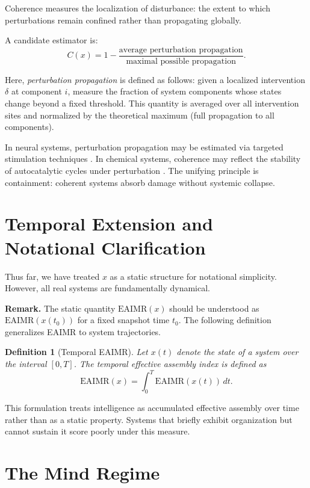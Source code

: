\documentclass[11pt,letterpaper]{article}
\newtheorem{definition}{Definition}
\begin{document}
Coherence measures the localization of disturbance: the extent to which perturbations remain confined rather than propagating globally.

A candidate estimator is:
\[
C(x) = 1 - \frac{\text{average perturbation propagation}}{\text{maximal possible propagation}}.
\]

Here, \emph{perturbation propagation} is defined as follows: given a localized intervention $\delta$ at component $i$, measure the fraction of system components whose states change beyond a fixed threshold. This quantity is averaged over all intervention sites and normalized by the theoretical maximum (full propagation to all components).

In neural systems, perturbation propagation may be estimated via targeted stimulation techniques \parencite{massimini2005}. In chemical systems, coherence may reflect the stability of autocatalytic cycles under perturbation \parencite{kauffman1993}. The unifying principle is containment: coherent systems absorb damage without systemic collapse.

\section{Temporal Extension and Notational Clarification}

Thus far, we have treated $x$ as a static structure for notational simplicity. However, all real systems are fundamentally dynamical.

\textbf{Remark.} The static quantity $\mathrm{EAIMR}(x)$ should be understood as $\mathrm{EAIMR}(x(t_0))$ for a fixed snapshot time $t_0$. The following definition generalizes EAIMR to system trajectories.

\begin{definition}[Temporal EAIMR]
Let $x(t)$ denote the state of a system over the interval $[0,T]$. The temporal effective assembly index is defined as
\[
\mathrm{EAIMR}(x) = \int_0^T \mathrm{EAIMR}(x(t)) \, dt.
\]
\end{definition}

This formulation treats intelligence as accumulated effective assembly over time rather than as a static property. Systems that briefly exhibit organization but cannot sustain it score poorly under this measure.

\section{The Mind Regime}
\end{document}
